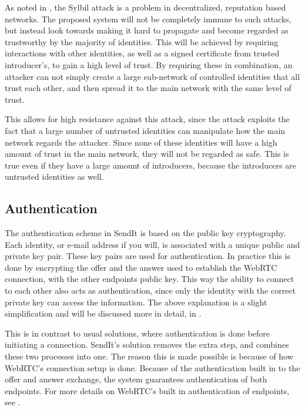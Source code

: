 		As noted in , the Sylbil attack is a problem in decentralized, reputation based networks. The proposed system will not be completely immune to such attacks, but instead look towards making it hard to propagate and become regarded as trustworthy by the majority of identities. This will be achieved by requiring interactions with other identities, as well as a signed certificate from trusted introducer's, to gain a high level of trust. By requiring these in combination, an attacker can not simply create a large sub-network of controlled identities that all trust each other, and then spread it to the main network with the same level of trust.

		This allows for high resistance against this attack, since the attack exploits the fact that a large number of untrusted identities can manipulate how the main network regards the attacker. Since none of these identities will have a high amount of trust in the main network, they will not be regarded as safe. This is true even if they have a large amount of introducers, because the introducers are untrusted identities as well.

	\subsection{Authentication}

		The authentication scheme in SendIt is based on the public key cryptography. Each identity, or e-mail address if you will, is associated with a unique public and private key pair. These key pairs are used for authentication. In practice this is done by encrypting the offer and the answer used to establish the WebRTC connection, with the other endpoints public key. This way the ability to connect to each other also acts as authentication, since only the identity with the correct private key can access the information. The above explanation is a slight simplification and will be discussed more in detail, in .

		This is in contrast to usual solutions, where authentication is done before initiating a connection. SendIt's solution removes the extra step, and combines these two processes into one. The reason this is made possible is because of how WebRTC's connection setup is done. Because of the authentication built in to the offer and answer exchange, the system guarantees authentication of both endpoints. For more details on WebRTC's built in authentication of endpoints, see .

